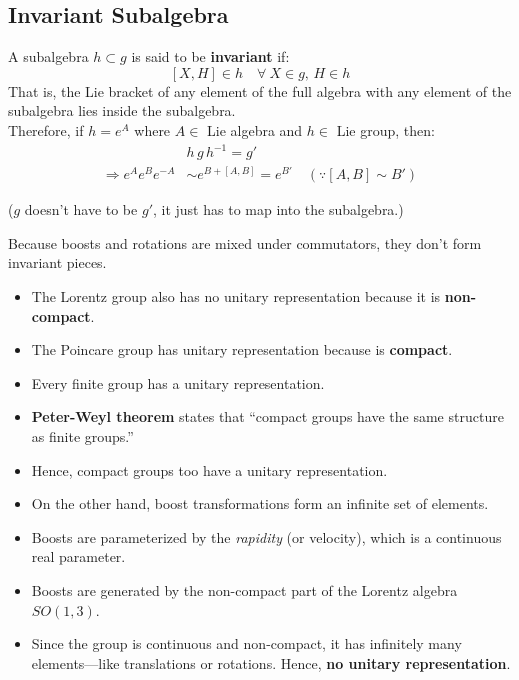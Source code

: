 \documentclass[14pt]{article} %
\begin{document}
\subsection*{Invariant Subalgebra}
A subalgebra $h \subset g$ is said to be \textbf{invariant} if:
\[
[X,H] \in h \quad \forall~ X \in g, \, H \in h
\]
That is, the Lie bracket of any element of the full algebra with any element of the subalgebra lies inside the subalgebra.\\
Therefore, if $h = e^A$ where $A \in$ Lie algebra and $h \in$ Lie group, then:
\begin{align*}
&h\,g\,h^{-1} = g' \\
\Rightarrow e^A e^B e^{-A} &\sim e^{B+[A,B]} = e^{B'} \quad (\because [A,B] \sim B' )
\end{align*}
\begin{center}
    ($g$ doesn’t have to be $g'$, it just has to map into the subalgebra.)
\end{center}
Because boosts and rotations are mixed under commutators, they don’t form invariant pieces.
\begin{tcolorbox}[proofbox, title=Notes]
\begin{itemize}
    \item The Lorentz group also has no unitary representation because it is \textbf{non-compact}.
    \item The Poincare group has unitary representation because is \textbf{compact}.
    \item Every finite group has a unitary representation.
    \item \textbf{Peter-Weyl theorem} states that “compact groups have the same structure as finite groups.”
    \item Hence, compact groups too have a unitary representation.
    \item On the other hand, boost transformations form an infinite set of elements.
    \item Boosts are parameterized by the \textit{rapidity} (or velocity), which is a continuous real parameter.
    \item Boosts are generated by the non-compact part of the Lorentz algebra $SO(1,3)$.
    \item Since the group is continuous and non-compact, it has infinitely many elements—like translations or rotations. Hence, \textbf{no unitary representation}.
\end{itemize}
\end{tcolorbox}
\end{document}
